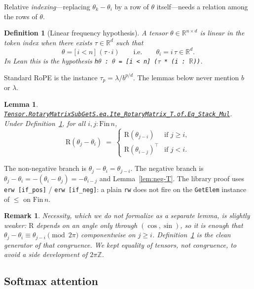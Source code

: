 \documentclass[11pt,a4paper]{article}
\newcommand{\lmod}[1]{\href{http://www.lemma.cn/lean/?module=#1}{\nolinkurl{#1}}}
\newtheorem{lemma}[theorem]{Lemma}
\newtheorem{definition}[theorem]{Definition}
\newtheorem{remark}[theorem]{Remark}
\newcommand{\R}{\mathbb{R}}
\newcommand{\rot}{\mathrm{R}}
\begin{document}
Relative \emph{indexing}---replacing \(\theta_k-\theta_i\) by a row of \(\theta\) itself---needs a relation among the rows of \(\theta\).

\begin{definition}[Linear frequency hypothesis]
\label{def:lin}
A tensor \(\theta\in\R^{n\times d}\) is linear in the token index when there exists \(\tau\in\R^d\) such that
\begin{equation}
  \theta = \bigl[\,i < n\,\bigr]\;(\tau\cdot i)
  \qquad\text{i.e.}\qquad
  \theta_i = i\,\tau\in\R^d.
\end{equation}
In Lean this is the hypothesis
\texttt{h\(\theta\) : \(\theta\) = [i < n] (\(\tau\) * (i : \(\mathbb{R}\)))}.
\end{definition}

Standard RoPE is the instance
\(\tau_p=\lambda/b^{p/d}\).
The lemmas below never mention \(b\) or \(\lambda\).

\begin{lemma}
\label{lem:ite}
\lmod{Tensor.RotaryMatrixSubGetS.eq.Ite_RotaryMatrix_T.of.Eq_Stack_Mul}.
Under Definition~\ref{def:lin}, for all \(i,j:\mathrm{Fin}\,n\),
\begin{equation}
  \rot(\theta_j-\theta_i)
  \;=\;
  \begin{cases}
    \rot(\theta_{j-i}) & \text{if }j\ge i,\\[0.25em]
    \rot(\theta_{i-j})^\top & \text{if }j<i.
  \end{cases}
\end{equation}
\end{lemma}

The non-negative branch is \(\theta_j-\theta_i=\theta_{j-i}\).
The negative branch is \(\theta_j-\theta_i=-(\theta_i-\theta_j)=-\theta_{i-j}\) and Lemma~\ref{lem:neg-T}.
The library proof uses \texttt{erw [if\_pos]} / \texttt{erw [if\_neg]}: a plain \texttt{rw} does not fire on the \texttt{GetElem} instance of \(\le\) on \(\mathrm{Fin}\,n\).

\begin{remark}
Necessity, which we do not formalize as a separate lemma, is slightly weaker: \(\rot\) depends on an angle only through \((\cos,\sin)\), so it is enough that
\(\theta_j-\theta_i\equiv\theta_{j-i}\pmod{2\pi}\)
componentwise on \(j\ge i\).
Definition~\ref{def:lin} is the clean generator of that congruence.
We kept equality of tensors, not congruence, to avoid a side development of \(2\pi\mathbb{Z}\).
\end{remark}

\subsection{Softmax attention}
\end{document}
